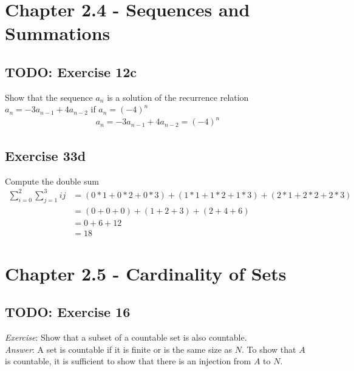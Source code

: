 \documentclass[12pt]{article}
\begin{document}
    \pagebreak     
    \section{Chapter 2.4 - Sequences and Summations}
    \subsection{TODO: Exercise 12c}
    Show that the sequence {$a_n$} is a solution of the recurrence relation $a_n=-3a_{n-1}+4a_{n-2}$ if $a_n = (-4)^n$
    \begin{equation}
        \begin{split}
            a_n = -3a_{n-1}+4a_{n-2} = (-4)^n
        \end{split}
    \end{equation}

    \subsection{Exercise 33d}
    Compute the double sum
    \begin{equation}
        \begin{split}
            \sum_{i=0}^{2}\sum_{j=1}^{3}ij &= (0*1+0*2+0*3)+(1*1+1*2+1*3)+(2*1+2*2+2*3) \\
            &= (0+0+0) + (1+2+3) + (2+4+6)\\ 
            &= 0 + 6 + 12\\ 
            &= 18 
        \end{split}
    \end{equation}

    \pagebreak     
    \section{Chapter 2.5 - Cardinality of Sets}
    \subsection{TODO: Exercise 16}
    \emph{Exercise}: 
    Show that a subset of a countable set is also countable.\\
    \emph{Answer}:
    A set is countable if it is finite or is the same size as $N$.
    To show that $A$ is countable, it is sufficient to show that there is an injection
    from $A$ to $N$.

    
\end{document}
